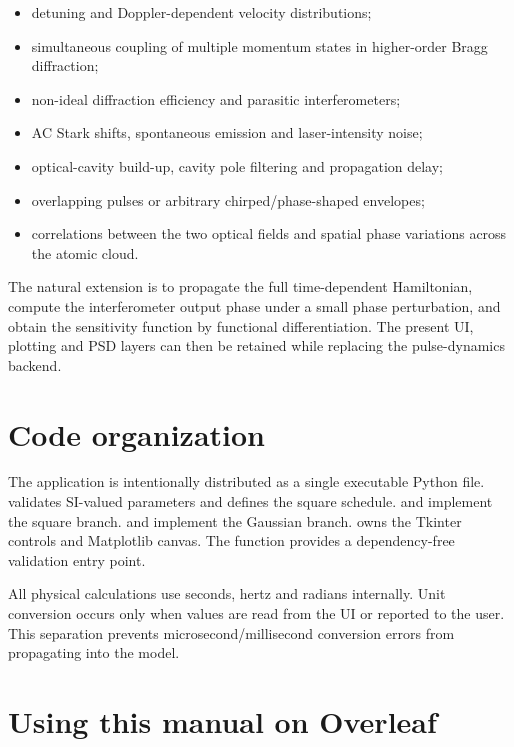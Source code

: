 \documentclass[11pt,a4paper]{article}
\begin{document}
\begin{itemize}
  \item detuning and Doppler-dependent velocity distributions;
  \item simultaneous coupling of multiple momentum states in higher-order Bragg diffraction;
  \item non-ideal diffraction efficiency and parasitic interferometers;
  \item AC Stark shifts, spontaneous emission and laser-intensity noise;
  \item optical-cavity build-up, cavity pole filtering and propagation delay;
  \item overlapping pulses or arbitrary chirped/phase-shaped envelopes;
  \item correlations between the two optical fields and spatial phase variations across the atomic cloud.
\end{itemize}

The natural extension is to propagate the full time-dependent Hamiltonian, compute the interferometer output phase under a small phase perturbation, and obtain the sensitivity function by functional differentiation. The present UI, plotting and PSD layers can then be retained while replacing the pulse-dynamics backend.

\section{Code organization}

The application is intentionally distributed as a single executable Python file.  validates SI-valued parameters and defines the square schedule.  and  implement the square branch.  and  implement the Gaussian branch.  owns the Tkinter controls and Matplotlib canvas. The  function provides a dependency-free validation entry point.

All physical calculations use seconds, hertz and radians internally. Unit conversion occurs only when values are read from the UI or reported to the user. This separation prevents microsecond/millisecond conversion errors from propagating into the model.

\section{Using this manual on Overleaf}
\end{document}
